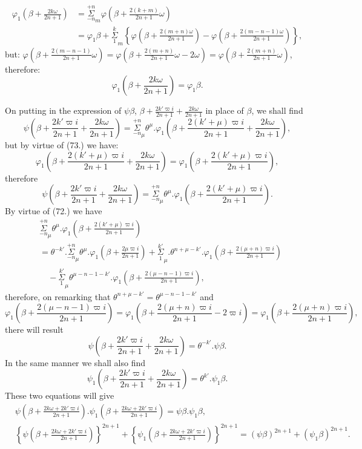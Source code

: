 \documentclass{article}
\begin{document}
\[ \begin{aligned}
\varphi_{1}\left(\beta+\frac{2k\omega}{2n+1}\right)&=\overset{+n}{\underset{-n}{\Sigma}}_{m}\varphi\left(\beta+\frac{2(k+m)}{2n+1}\omega\right)\\
&=\varphi_{1}\beta+\overset{k}{\underset{1}{\Sigma}}_{m}\left\{\varphi\left(\beta+\frac{2(m+n)\omega}{2n+1}\right)-\varphi\left(\beta+\frac{2(m-n-1)\omega}{2n+1}\right)\right\},
\end{aligned} \]
but: $\varphi\left(\beta+\frac{2(m-n-1)}{2n+1}\omega\right)=\varphi\left(\beta+\frac{2(m+n)}{2n+1}\omega-2\omega\right)=\varphi\left(\beta+\frac{2(m+n)}{2n+1}\omega\right)$,
therefore:
\[ \varphi_{1}\left(\beta+\frac{2k\omega}{2n+1}\right)=\varphi_{1}\beta. \tag{73.} \]

On putting in the expression of $\psi\beta$, $\beta+\frac{2k'\varpi i}{2n+1}+\frac{2k\omega}{2n+1}$ in place of $\beta$, we shall find
\[ \psi\left(\beta+\frac{2k'\varpi i}{2n+1}+\frac{2k\omega}{2n+1}\right)=\overset{+n}{\underset{-n}{\Sigma}}_{\mu}\theta^{\mu}.\varphi_{1}\left(\beta+\frac{2(k'+\mu)\varpi i}{2n+1}+\frac{2k\omega}{2n+1}\right), \]
but by virtue of (73.) we have:
\[ \varphi_{1}\left(\beta+\frac{2(k'+\mu)\varpi i}{2n+1}+\frac{2k\omega}{2n+1}\right)=\varphi_{1}\left(\beta+\frac{2(k'+\mu)\varpi i}{2n+1}\right), \]
therefore
\[ \psi\left(\beta+\frac{2k'\varpi i}{2n+1}+\frac{2k\omega}{2n+1}\right)=\overset{+n}{\underset{-n}{\Sigma}}_{\mu}\theta^{\mu}.\varphi_{1}\left(\beta+\frac{2(k'+\mu)\varpi i}{2n+1}\right). \]
By virtue of (72.) we have
\[ \begin{aligned}
&\overset{+n}{\underset{-n}{\Sigma}}_{\mu}\theta^{\mu}.\varphi_{1}\left(\beta+\frac{2(k'+\mu)\varpi i}{2n+1}\right)\\
&=\theta^{-k'}.\overset{+n}{\underset{-n}{\Sigma}}_{\mu}\theta^{\mu}.\varphi_{1}\left(\beta+\frac{2\mu\varpi i}{2n+1}\right)+\overset{k'}{\underset{1}{\Sigma}}_{\mu}.\theta^{n+\mu-k'}.\varphi_{1}\left(\beta+\frac{2(\mu+n)\varpi i}{2n+1}\right)\\
&\quad-\overset{k'}{\underset{1}{\Sigma}}_{\mu}\theta^{\mu-n-1-k'}.\varphi_{1}\left(\beta+\frac{2(\mu-n-1)\varpi i}{2n+1}\right),
\end{aligned} \]
therefore, on remarking that $\theta^{n+\mu-k'}=\theta^{\mu-n-1-k'}$ and
\[ \varphi_{1}\left(\beta+\frac{2(\mu-n-1)\varpi i}{2n+1}\right)=\varphi_{1}\left(\beta+\frac{2(\mu+n)\varpi i}{2n+1}-2\varpi i\right)=\varphi_{1}\left(\beta+\frac{2(\mu+n)\varpi i}{2n+1}\right), \]
there will result
\[ \psi\left(\beta+\frac{2k'\varpi i}{2n+1}+\frac{2k\omega}{2n+1}\right)=\theta^{-k'}.\psi\beta. \tag{74.} \]
In the same manner we shall also find
\[ \psi_{1}\left(\beta+\frac{2k'\varpi i}{2n+1}+\frac{2k\omega}{2n+1}\right)=\theta^{k'}.\psi_{1}\beta. \]
These two equations will give
\[ \begin{aligned}
&\psi\left(\beta+\frac{2k\omega+2k'\varpi i}{2n+1}\right).\psi_{1}\left(\beta+\frac{2k\omega+2k'\varpi i}{2n+1}\right)=\psi\beta.\psi_{1}\beta,\\
&\left\{\psi\left(\beta+\frac{2k\omega+2k'\varpi i}{2n+1}\right)\right\}^{2n+1}+\left\{\psi_{1}\left(\beta+\frac{2k\omega+2k'\varpi i}{2n+1}\right)\right\}^{2n+1}=(\psi\beta)^{2n+1}+(\psi_{1}\beta)^{2n+1}.
\end{aligned} \]
\end{document}
